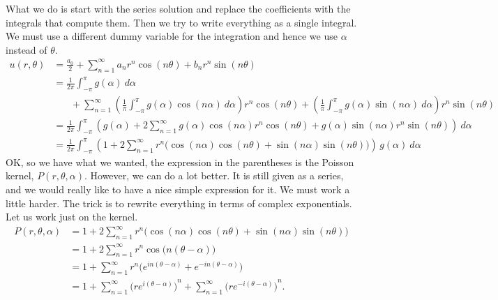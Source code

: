 What we do is start with the series solution and replace the coefficients
with the integrals that compute them.  Then we try to write everything as
a single integral.  We must use a different dummy variable for the
integration and hence we use $\alpha$ instead of $\theta$.
\begin{equation*}
\begin{split}
u(r,\theta)
& =
\frac{a_0}{2} +
\sum_{n=1}^\infty
a_n r^n \cos(n \theta) + b_n r^n \sin(n \theta)
\\
& =
\frac{1}{2\pi} \int_{-\pi}^\pi g(\alpha) ~ d\alpha
\\
& ~~~~~~~~ +
\sum_{n=1}^\infty
\left( \frac{1}{\pi} \int_{-\pi}^\pi g(\alpha) \cos (n\alpha) ~ d\alpha
\right)
r^n \cos(n \theta) +
\left( \frac{1}{\pi} \int_{-\pi}^\pi g(\alpha) \sin (n\alpha) ~ d\alpha
\right)
r^n \sin(n \theta)
\\
& =
\frac{1}{2\pi}
\int_{-\pi}^\pi
\left(  g(\alpha)
+
2
\sum_{n=1}^\infty
g(\alpha) \cos (n\alpha) 
r^n \cos(n \theta) +
g(\alpha) \sin (n\alpha)
r^n \sin(n \theta)
\right) ~d\alpha
\\
& =
\frac{1}{2\pi}
\int_{-\pi}^\pi
\left( 1
+
2
\sum_{n=1}^\infty
r^n 
\bigl(
\cos (n\alpha) 
\cos(n \theta) +
\sin (n\alpha)
\sin(n \theta) \bigr)
\right) \, g(\alpha) ~d\alpha
\end{split}
\end{equation*}
OK, so we have what we wanted, the expression in the parentheses is the
Poisson kernel, $P(r,\theta,\alpha)$.  However, we can do a lot better.  It is still given as a
series, and we would really like to have a nice simple expression for it. 
We must work a little harder.  The trick is to rewrite everything in terms of
complex exponentials.  Let us work
just on the kernel.
\begin{equation*}
\begin{split}
P(r,\theta,\alpha)
& =
1
+
2
\sum_{n=1}^\infty
r^n 
\bigl(
\cos (n\alpha) 
\cos(n \theta) +
\sin (n\alpha)
\sin(n \theta) \bigr)
\\
& =
1
+
2
\sum_{n=1}^\infty
r^n 
\cos \bigl(n(\theta-\alpha)\bigr)
\\
& =
1
+
\sum_{n=1}^\infty
r^n 
\bigl(
e^{in(\theta-\alpha)} +
e^{-in(\theta-\alpha)} \bigr)
\\
& =
1
+
\sum_{n=1}^\infty
{\bigl(
re^{i(\theta-\alpha)}\bigr)}^{n}
+
\sum_{n=1}^\infty
{\bigl(
re^{-i(\theta-\alpha)}\bigr)}^{n} .
\end{split}
\end{equation*}
